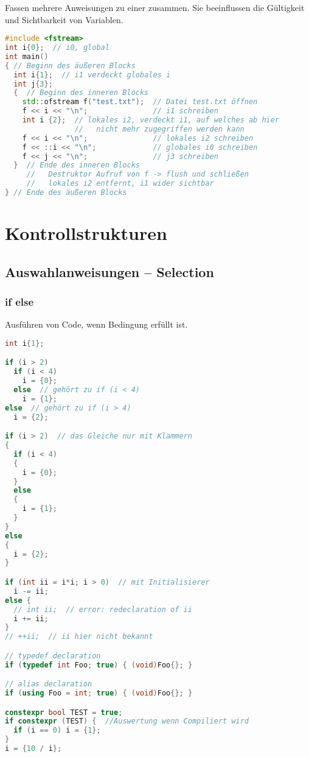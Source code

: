 \documentclass[10pt,twocolumn]{scrartcl}
\begin{document}
Fassen mehrere Anweisungen zu einer zusammen. Sie beeinflussen die Gültigkeit
und Sichtbarkeit von Variablen.

\begin{lstlisting}[language=C++]
#include <fstream>
int i{0};  // i0, global
int main()
{ // Beginn des äußeren Blocks
  int i{1};  // i1 verdeckt globales i
  int j{3};
  {  // Beginn des inneren Blocks
    std::ofstream f("test.txt");  // Datei test.txt öffnen
    f << i << "\n";               // i1 schreiben
    int i {2};  // lokales i2, verdeckt i1, auf welches ab hier
                //   nicht mehr zugegriffen werden kann
    f << i << "\n";               // lokales i2 schreiben
    f << ::i << "\n";             // globales i0 schreiben
    f << j << "\n";               // j3 schreiben
  }  // Ende des inneren Blocks
     //   Destruktor Aufruf von f -> flush und schließen
     //   lokales i2 entfernt, i1 wider sichtbar
} // Ende des äußeren Blocks
\end{lstlisting}

\section{Kontrollstrukturen}

\subsection{Auswahlanweisungen -- Selection}

\subsubsection{if else}

Ausführen von Code, wenn Bedingung erfüllt ist.

\begin{lstlisting}[language=C++]
int i{1};

if (i > 2)
  if (i < 4)
    i = {0};
  else  // gehört zu if (i < 4)
    i = {1};
else  // gehört zu if (i > 4)
  i = {2};

if (i > 2)  // das Gleiche nur mit Klammern
{
  if (i < 4)
  {
    i = {0};
  }
  else
  {
    i = {1};
  }
}
else
{
  i = {2};
}

if (int ii = i*i; i > 0)  // mit Initialisierer
  i -= ii;
else {
  // int ii;  // error: redeclaration of ii
  i += ii;
}
// ++ii;  // ii hier nicht bekannt

// typedef declaration
if (typedef int Foo; true) { (void)Foo{}; }

// alias declaration
if (using Foo = int; true) { (void)Foo{}; }

constexpr bool TEST = true;
if constexpr (TEST) {  //Auswertung wenn Compiliert wird
  if (i == 0) i = {1};
}
i = {10 / i};
\end{lstlisting}
\end{document}
